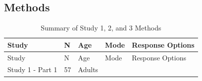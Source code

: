 \documentclass[oneside]{report}
\theoremstyle{definition}
\theoremstyle{definition}
\theoremstyle{definition}
\theoremstyle{remark}
\begin{document}
\subsection{Methods}\label{methods-4}
\begin{longtable}[]{@{}lllll@{}}
\caption{\label{tab:study3info} Summary of Study 1, 2, and 3
Methods}\tabularnewline
\toprule
\begin{minipage}[b]{0.19\columnwidth}\raggedright\strut
Study\strut
\end{minipage} & \begin{minipage}[b]{0.02\columnwidth}\raggedright\strut
N\strut
\end{minipage} & \begin{minipage}[b]{0.20\columnwidth}\raggedright\strut
Age\strut
\end{minipage} & \begin{minipage}[b]{0.11\columnwidth}\raggedright\strut
Mode\strut
\end{minipage} & \begin{minipage}[b]{0.32\columnwidth}\raggedright\strut
Response Options\strut
\end{minipage}\tabularnewline
\midrule
\endfirsthead
\toprule
\begin{minipage}[b]{0.19\columnwidth}\raggedright\strut
Study\strut
\end{minipage} & \begin{minipage}[b]{0.02\columnwidth}\raggedright\strut
N\strut
\end{minipage} & \begin{minipage}[b]{0.20\columnwidth}\raggedright\strut
Age\strut
\end{minipage} & \begin{minipage}[b]{0.11\columnwidth}\raggedright\strut
Mode\strut
\end{minipage} & \begin{minipage}[b]{0.32\columnwidth}\raggedright\strut
Response Options\strut
\end{minipage}\tabularnewline
\midrule
\endhead
\begin{minipage}[t]{0.19\columnwidth}\raggedright\strut
Study 1 - Part 1\strut
\end{minipage} & \begin{minipage}[t]{0.02\columnwidth}\raggedright\strut
57\strut
\end{minipage} & \begin{minipage}[t]{0.20\columnwidth}\raggedright\strut
Adults\strut
\end{minipage} & \begin{minipage}[t]{0.11\columnwidth}\raggedright\strut

\end{minipage}
\end{longtable}
\end{document}
